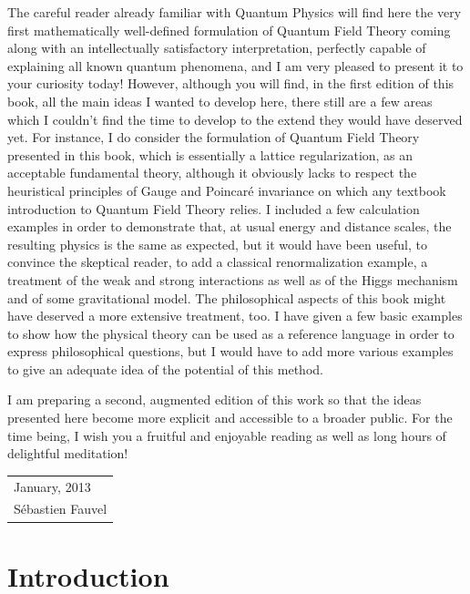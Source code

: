 \documentclass[10pt,a4paper,twoside,openany]{book}
\begin{document}
The careful reader already familiar with Quantum Physics will find here the very first mathematically well-defined formulation of Quantum Field Theory coming along with an intellectually satisfactory interpretation, perfectly capable of explaining all known quantum phenomena, and I am very pleased to present it to your curiosity today! However, although you will find, in the first edition of this book, all the main ideas I wanted to develop here, there still are a few areas which I couldn't find the time to develop to the extend they would have deserved yet. For instance, I do consider the formulation of Quantum Field Theory presented in this book, which is essentially a lattice regularization, as an acceptable fundamental theory, although it obviously lacks to respect the heuristical principles of Gauge and Poincaré invariance on which any textbook introduction to Quantum Field Theory relies. I included a few calculation examples in order to demonstrate that, at usual energy and distance scales, the resulting physics is the same as expected, but it would have been useful, to convince the skeptical reader, to add a classical renormalization example, a treatment of the weak and strong interactions as well as of the Higgs mechanism and of some gravitational model. The philosophical aspects of this book might have deserved a more extensive treatment, too. I have given a few basic examples to show how the physical theory can be used as a reference language in order to express philosophical questions, but I would have to add more various examples to give an adequate idea of the potential of this method.

I am preparing a second, augmented edition of this work so that the ideas presented here become more explicit and accessible to a broader public. For the time being, I wish you a fruitful and enjoyable reading as well as long hours of delightful meditation!

\begin{flushright}
\begin{tabular}{l}
January, 2013\\
Sébastien Fauvel
\end{tabular}
\end{flushright}

\cleardoublepage
\tableofcontents

\chapter{Introduction}
\end{document}

